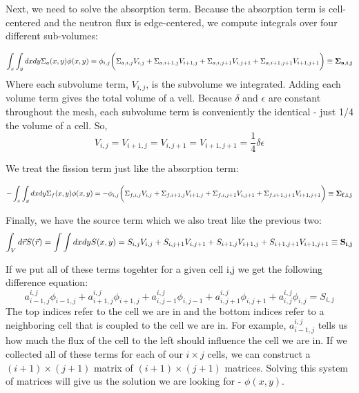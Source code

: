 \documentclass[a4paper,12pt]{article}
\begin{document}
Next, we need to solve the absorption term. Because the absorption term is cell-centered and the neutron flux is edge-centered, we compute integrals over four different sub-volumes:

\begin{equation}
    \int_{x}\int_{y}dxdy\Sigma_{a}(x,y)\phi(x,y) = \phi_{i,j}\bigg(\Sigma_{a, i,j}V_{i,j} + \Sigma_{a, i+1,j}V_{i+1,j} + \Sigma_{a, i,j+1}V_{i,j+1} + \Sigma_{a, i+1,j+1}V_{i+1,j+1} \bigg)\equiv \bf{\Sigma_{a,i,j}}
\end{equation}
 Where each subvolume term, $V_{i,j}$, is the subvolume we integrated. Adding each volume term gives the total volume of a vell. Because $\delta$ and $\epsilon$ are constant throughout the mesh, each subvolume term is conveniently the identical - just 1/4 the volume of a cell. So,
 \begin{equation}
     V_{i,j}=V_{i+1,j}=V_{i,j+1}=V_{i+1,j+1} = \frac{1}{4}\delta\epsilon
 \end{equation}

 We treat the fission term just like the absorption term:

 \begin{equation}
    -\int_{x}\int_{y}dxdy\Sigma_{f}(x,y)\phi(x,y) = -\phi_{i,j}\bigg(\Sigma_{f,i,j}V_{i,j} + \Sigma_{f, i+1,j}V_{i+1,j} + \Sigma_{f, i,j+1}V_{i,j+1} + \Sigma_{f, i+1,j+1}V_{i+1,j+1} \bigg) \equiv \bf{\Sigma_{f,i,j}}
 \end{equation}

 Finally, we have the source term which we also treat like the previous two:
 \begin{equation}
     \int_{V}d\vec{r}S(\vec{r}) = \int\int dxdy S(x,y) = S_{i,j}V_{i,j} + S_{i,j+1}V_{i,j+1}+S_{i+1,j}V_{i+1,j} + S_{i+1,j+1}V_{i+1,j+1} \equiv \bf{S_{i,j}}
 \end{equation}


If we put all of these terms togehter for a given cell i,j we get the following difference equation:
\begin{equation}
    a_{i-1,j}^{i,j}\phi_{i-1,j} +
    a_{i+1,j}^{i,j}\phi_{i+1,j} +
    a_{i,j-1}^{i,j}\phi_{i,j-1} +
    a_{i,j+1}^{i,j}\phi_{i,j+1} +
    a_{i,j}^{i,j}\phi_{i,j} = S_{i,j}
\end{equation}
The top indices refer to the cell we are in and the bottom indices refer to a neighboring cell that is coupled to the cell we are in. For example, $a_{i-1,j}^{i,j}$ tells us how much the flux of the cell to the left should influence the cell we are in.
If we collected all of these terms for each of our $i\times j$ cells, we can construct a $(i+1)\times(j+1)$ matrix of $(i+1)\times(j+1)$ matrices. Solving this system of matrices will give us the solution we are looking for - $\phi(x,y)$.
\end{document}
